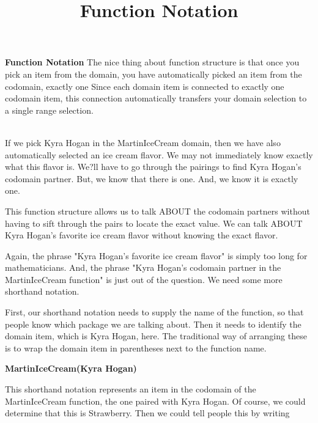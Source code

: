 \documentclass{ximera}
\title{Function Notation}
\begin{document}
\begin{abstract}
\end{abstract}

\maketitle




\begin{remark} \textbf{Function Notation}
The nice thing about function structure is that once you pick an item from the domain, you have automatically picked an item from the codomain, exactly one  Since each domain item is connected to exactly one codomain item, this connection automatically transfers your domain selection to a single range selection.
\end{remark}
\quad \\


If we pick Kyra Hogan in the MartinIceCream domain, then we have also automatically selected an ice cream flavor.  We may not immediately know exactly what this flavor is. We?ll have to go through the pairings to find Kyra Hogan's codomain partner.  But, we know that there is one. And, we know it is exactly one.

This function structure allows us to talk ABOUT the codomain partners without having to sift through the pairs to locate the exact value.  We can talk ABOUT Kyra Hogan's favorite ice cream flavor without knowing the exact flavor.  

Again, the phrase "Kyra Hogan's favorite ice cream flavor" is simply too long for mathematicians. And, the phrase "Kyra Hogan's codomain partner in the MartinIceCream function" is just out of the question. We need some more shorthand notation.

First, our shorthand notation needs to supply the name of the function, so that people know which package we are talking about.  Then it needs to identify the domain item, which is Kyra Hogan, here.  The traditional way of arranging these is to wrap the domain item in parentheses next to the function name.

\begin{center}
\textbf{MartinIceCream(Kyra Hogan)}
\end{center}

This shorthand notation represents an item in the codomain of the MartinIceCream function, the one paired with Kyra Hogan.  Of course, we could determine that this is Strawberry.  Then we could tell people this by writing
\end{document}
